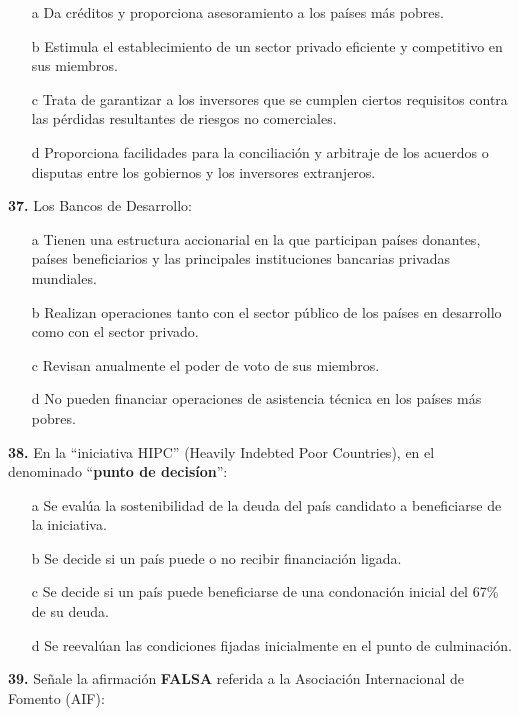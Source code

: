 \documentclass{nuevotema}
\begin{document}
\begin{itemize}
	\item[a] Da créditos y proporciona asesoramiento a los países más pobres.
	\item[b] Estimula el establecimiento de un sector privado eficiente y competitivo en sus miembros.
	\item[c] Trata de garantizar a los inversores que se cumplen ciertos requisitos contra las pérdidas resultantes de riesgos no comerciales.
	\item[d] Proporciona facilidades para la conciliación y arbitraje de los acuerdos o disputas entre los gobiernos y los inversores extranjeros.
\end{itemize}

\textbf{37.} Los Bancos de Desarrollo:

\begin{itemize}
	\item[a] Tienen una estructura accionarial en la que participan países donantes, países beneficiarios y las principales instituciones bancarias privadas mundiales.
	\item[b] Realizan operaciones tanto con el sector público de los países en desarrollo como con el sector privado.
	\item[c] Revisan anualmente el poder de voto de sus miembros.
	\item[d] No pueden financiar operaciones de asistencia técnica en los países más pobres.
\end{itemize}

\textbf{38.} En la ``iniciativa HIPC'' (Heavily Indebted Poor Countries), en el denominado ``\textbf{punto de decisíon}'':

\begin{itemize}
	\item[a] Se evalúa la sostenibilidad de la deuda del país candidato a beneficiarse de la iniciativa.
	\item[b] Se decide si un país puede o no recibir financiación ligada.
	\item[c] Se decide si un país puede beneficiarse de una condonación inicial del 67\% de su deuda.
	\item[d] Se reevalúan las condiciones fijadas inicialmente en el punto de culminación.
\end{itemize}


\textbf{39.} Señale la afirmación \textbf{FALSA} referida a la Asociación Internacional de Fomento (AIF):
\end{document}
